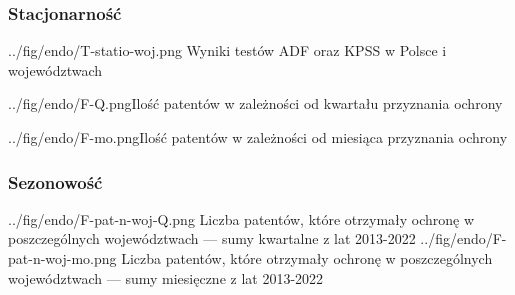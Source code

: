   \subsubsection
{Stacjonarność}

  \tblside
{../fig/endo/T-statio-woj.png}
{ Wyniki testów ADF oraz KPSS w Polsce i województwach}



  \fig
{../fig/endo/F-Q.png}{Ilość patentów w zależności od kwartału przyznania ochrony}

  \fig
{../fig/endo/F-mo.png}{Ilość patentów w zależności od miesiąca przyznania ochrony}



  \newpage\subsubsection
{Sezonowość}

  \figsides
{../fig/endo/F-pat-n-woj-Q.png}
{ Liczba patentów, które otrzymały ochronę w poszczególnych województwach 
  --- sumy kwartalne z lat 2013-2022 }
{../fig/endo/F-pat-n-woj-mo.png}
{ Liczba patentów, które otrzymały ochronę w poszczególnych województwach 
  --- sumy miesięczne z lat 2013-2022 }